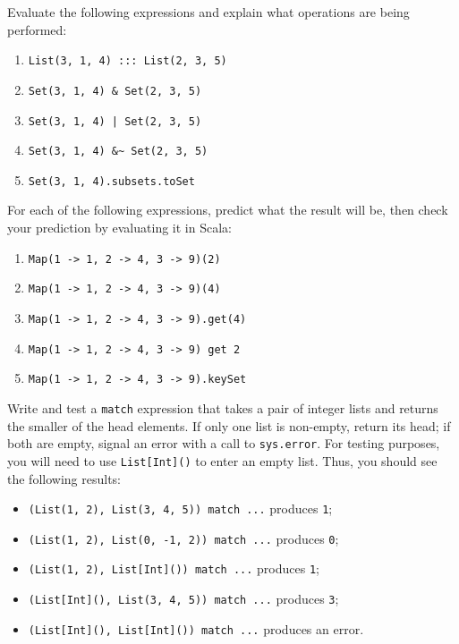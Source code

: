 \begin{exercises}
\problem Evaluate the following expressions and explain what operations are being performed:
\begin{enumerate}
\item \verb|List(3, 1, 4) ::: List(2, 3, 5)|
\item \verb|Set(3, 1, 4) & Set(2, 3, 5)|
\item \verb-Set(3, 1, 4) | Set(2, 3, 5)-
\item \verb|Set(3, 1, 4) &~ Set(2, 3, 5)|
\item \verb|Set(3, 1, 4).subsets.toSet|
\end{enumerate}

\problem For each of the following expressions, predict what the result will be, then check your prediction by evaluating it in Scala:
\begin{enumerate}
\item \verb|Map(1 -> 1, 2 -> 4, 3 -> 9)(2)|
\item \verb|Map(1 -> 1, 2 -> 4, 3 -> 9)(4)|
\item \verb|Map(1 -> 1, 2 -> 4, 3 -> 9).get(4)|
\item \verb|Map(1 -> 1, 2 -> 4, 3 -> 9) get 2|
\item \verb|Map(1 -> 1, 2 -> 4, 3 -> 9).keySet|
\end{enumerate}

\problem Write and test a \texttt{match} expression that takes a pair of integer lists and returns the smaller of the head elements. If only one list is non-empty, return its head; if both are empty, signal an error with a call to \texttt{sys.error}. For testing purposes, you will need to use \verb|List[Int]()| to enter an empty list. Thus, you should see the following results:
\begin{itemize}
\item \verb|(List(1, 2), List(3, 4, 5)) match ...| produces \texttt{1};
\item \verb|(List(1, 2), List(0, -1, 2)) match ...| produces \texttt{0};
\item \verb|(List(1, 2), List[Int]()) match ...| produces \texttt{1};
\item \verb|(List[Int](), List(3, 4, 5)) match ...| produces \texttt{3};
\item \verb|(List[Int](), List[Int]()) match ...| produces an error.
\end{itemize} 
\end{exercises}

